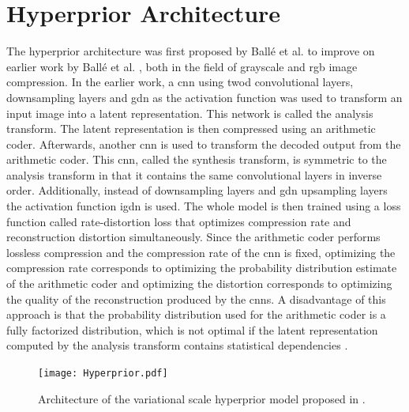 \section{Hyperprior Architecture\label{sec3:hyperprior}}
The hyperprior architecture was first proposed by Ballé et al. \citep{balle_variational_2018} to improve on earlier work by Ballé et al. \citep{balle_end--end_2017}, both in the field of grayscale and \ac{rgb} image compression. In the earlier work, a \ac{cnn} using \ac{twod} convolutional layers, downsampling layers and \ac{gdn} as the activation function was used to transform an input image into a latent representation. This network is called the analysis transform. The latent representation is then compressed using an arithmetic coder. Afterwards, another \ac{cnn} is used to transform the decoded output from the arithmetic coder. This \ac{cnn}, called the synthesis transform, is symmetric to the analysis transform in that it contains the same convolutional layers in inverse order. Additionally, instead of downsampling layers and \ac{gdn} upsampling layers the activation function \ac{igdn} is used. The whole model is then trained using a loss function called rate-distortion loss that optimizes compression rate and reconstruction distortion simultaneously. Since the arithmetic coder performs lossless compression and the compression rate of the \ac{cnn} is fixed, optimizing the compression rate corresponds to optimizing the probability distribution estimate of the arithmetic coder and optimizing the distortion corresponds to optimizing the quality of the reconstruction produced by the \acp{cnn}. A disadvantage of this approach is that the probability distribution used for the arithmetic coder is a fully factorized distribution, which is not optimal if the latent representation computed by the analysis transform contains statistical dependencies \citep{balle_variational_2018}.

\begin{figure}
\centering
\texttt{[image: Hyperprior.pdf]}
\caption[Scale Hyperprior Architecture]{Architecture of the variational scale hyperprior model proposed in \citep{balle_variational_2018}.}
\label{fig:hyperprior}
\end{figure}

